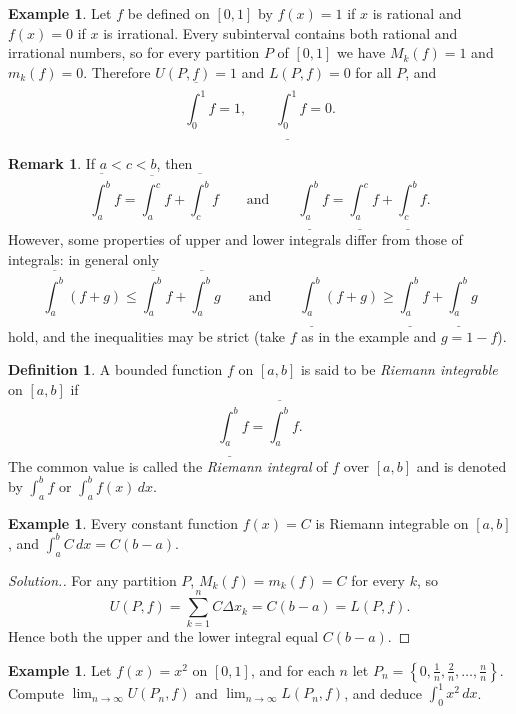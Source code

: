 \documentclass[11pt,a4paper]{article}
\numberwithin{equation}{section}
\theoremstyle{definition}
\newtheorem{defn}[thm]{Definition}
\newtheorem{exa}[thm]{Example}
\newtheorem*{remark}{Remark}
\newenvironment{solution}
  {\renewcommand{\qedsymbol}{}\begin{proof}[\textit{Solution}.]}
  {\end{proof}}
\begin{document}
\begin{exa}
Let $f$ be defined on $[0,1]$ by $f(x) = 1$ if $x$ is rational and $f(x) = 0$ if $x$ is irrational. Every subinterval contains both rational and irrational numbers, so for every partition $P$ of $[0,1]$ we have $M_k(f) = 1$ and $m_k(f) = 0$. Therefore $U(P,f) = 1$ and $L(P,f) = 0$ for all $P$, and
$$\overline{\int^1_0} f = 1 ,\qquad \underline{\int^1_0} f = 0.$$
\end{exa}

\begin{remark}
If $a< c < b$, then
$$\overline{\int^b_a} f = \overline{\int^c_a} f + \overline{\int^b_c} f \qquad\text{and}\qquad \underline{\int^b_a} f = \underline{\int^c_a} f + \underline{\int^b_c} f .$$
However, some properties of upper and lower integrals differ from those of integrals: in general only
$$\overline{\int^b_a} (f + g) \leq \overline{\int^b_a} f + \overline{\int^b_a} g\qquad \text{and}\qquad \underline{\int^b_a} (f + g) \geq \underline{\int^b_a} f + \underline{\int^b_a} g$$
hold, and the inequalities may be strict (take $f$ as in the example and $g = 1-f$).
\end{remark}


\begin{defn}
A bounded function $f$ on $[a,b]$ is said to be \emph{Riemann integrable} on $[a,b]$ if
$$\underline{\int^b_a} f = \overline{\int^b_a} f .$$
The common value is called the \emph{Riemann integral} of $f$ over $[a,b]$ and is denoted by $\int^b_a f$ or $\int^b_a f(x)\,dx$.
\end{defn}


\begin{exa}
Every constant function $f(x) = C$ is Riemann integrable on $[a,b]$, and $\int^b_a C\,dx = C(b-a)$.
\end{exa}

\begin{solution}
For any partition $P$, $M_k(f) = m_k(f) = C$ for every $k$, so
$$U(P,f) = \sum^n_{k = 1} C \Delta x_k = C(b - a) = L(P,f).$$
Hence both the upper and the lower integral equal $C(b-a)$.
\end{solution}


\begin{exa}
Let $f(x)  = x^2$ on $[0,1]$, and for each $n$ let $P_n = \left\{0, \frac{1}{n}, \frac{2}{n}, \dots, \frac{n}{n}\right\}$. Compute $\lim_{n\rightarrow \infty} U(P_n,f)$ and $\lim_{n \rightarrow \infty} L(P_n,f)$, and deduce $\int_0^1x^2\,dx$.
\end{exa}
\end{document}
